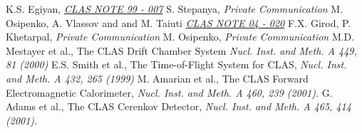 \begin{thebibliography}{mybib}
     {K.S. Egiyan}, \href{http://www.jlab.org/Hall-B/notes/clas_notes99/ec_thresh.ps}{\it CLAS NOTE 99 - 007}
  {S. Stepanya}, {\it Private Communication}
   {M. Osipenko, A. Vlassov and and M. Taiuti } \href{http://www1.jlab.org/ul/Physics/Hall-B/clas/public/2004-020.pdf}{\it CLAS NOTE 04 - 020}
  {F.X. Girod, P. Khetarpal}, {\it Private Communication}
    {M. Osipenko}, {\it Private Communication}
    {M.D. Mestayer et al.}, The CLAS Drift Chamber System {\it Nucl. Inst. and Meth. A 449, 81 (2000)}
   {E.S. Smith et al.}, The Time-of-Flight System for CLAS, {\it Nucl. Inst. and Meth. A 432, 265 (1999)}
   {M. Amarian et al.}, The CLAS Forward Electromagnetic Calorimeter, {\it Nucl. Inst. and Meth. A 460, 239 (2001).}
   {G. Adams et al.}, The CLAS Cerenkov Detector, {\it Nucl. Inst. and Meth. A 465, 414 (2001).}

\end{thebibliography}
